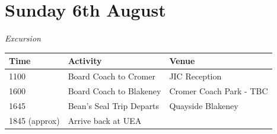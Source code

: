 \documentclass[12pt,]{book}
\begin{document}
\section*{Sunday 6th August}\label{sunday-6th-august}

\emph{Excursion}

\begin{longtable}[]{@{}lll@{}}
\toprule
\begin{minipage}[b]{0.18\columnwidth}\raggedright\strut
Time\strut
\end{minipage} & \begin{minipage}[b]{0.32\columnwidth}\raggedright\strut
Activity\strut
\end{minipage} & \begin{minipage}[b]{0.32\columnwidth}\raggedright\strut
Venue\strut
\end{minipage}\tabularnewline
\midrule
\endhead
\begin{minipage}[t]{0.18\columnwidth}\raggedright\strut
1100\strut
\end{minipage} & \begin{minipage}[t]{0.32\columnwidth}\raggedright\strut
Board Coach to Cromer\strut
\end{minipage} & \begin{minipage}[t]{0.32\columnwidth}\raggedright\strut
JIC Reception\strut
\end{minipage}\tabularnewline
\begin{minipage}[t]{0.18\columnwidth}\raggedright\strut
1600\strut
\end{minipage} & \begin{minipage}[t]{0.32\columnwidth}\raggedright\strut
Board Coach to Blakeney\strut
\end{minipage} & \begin{minipage}[t]{0.32\columnwidth}\raggedright\strut
Cromer Coach Park - TBC\strut
\end{minipage}\tabularnewline
\begin{minipage}[t]{0.18\columnwidth}\raggedright\strut
1645\strut
\end{minipage} & \begin{minipage}[t]{0.32\columnwidth}\raggedright\strut
Bean's Seal Trip Departs\strut
\end{minipage} & \begin{minipage}[t]{0.32\columnwidth}\raggedright\strut
Quayside Blakeney\strut
\end{minipage}\tabularnewline
\begin{minipage}[t]{0.18\columnwidth}\raggedright\strut
1845 (approx)\strut
\end{minipage} & \begin{minipage}[t]{0.32\columnwidth}\raggedright\strut
Arrive back at UEA\strut
\end{minipage} & \begin{minipage}[t]{0.32\columnwidth}\raggedright\strut
\strut
\end{minipage}\tabularnewline
\bottomrule
\end{longtable}
\end{document}
